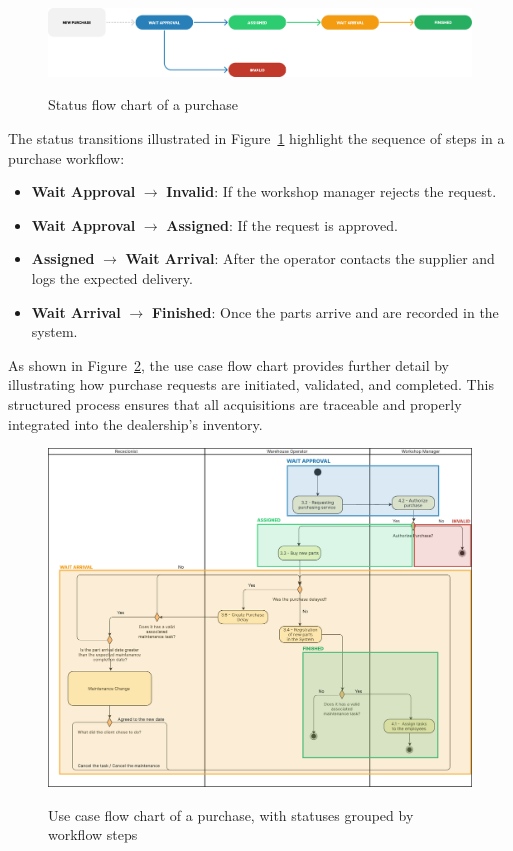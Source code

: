 \begin{figure}[h]
  \caption{Status flow chart of a purchase}
  \centering
  \includegraphics[width=\textwidth]{figs/Status/Purchase/StatusDiagram}
  \label{fig:purchaseFlowChart}
\end{figure}

The status transitions illustrated in Figure~\ref{fig:purchaseFlowChart} highlight the sequence of steps in a purchase workflow:
\begin{itemize}
\item \textbf{Wait Approval} $\rightarrow$ \textbf{Invalid}: If the workshop manager rejects the request.
\item \textbf{Wait Approval} $\rightarrow$ \textbf{Assigned}: If the request is approved.
\item \textbf{Assigned} $\rightarrow$ \textbf{Wait Arrival}: After the operator contacts the supplier and logs the expected delivery.
\item \textbf{Wait Arrival} $\rightarrow$ \textbf{Finished}: Once the parts arrive and are recorded in the system.
\end{itemize}


As shown in Figure~\ref{fig:purchaseUseCase}, the use case flow chart provides further detail by illustrating how purchase requests are initiated, validated, and completed. This structured process ensures that all acquisitions are traceable and properly integrated into the dealership's inventory.

\begin{figure}[h]
  \caption{Use case flow chart of a purchase, with statuses grouped by workflow steps}
  \centering
  \includegraphics[width=\textwidth]{figs/Status/Purchase/UseCaseStatus}
  \label{fig:purchaseUseCase}
\end{figure}



